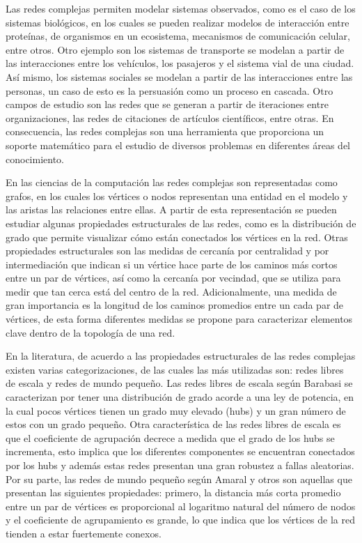 Las redes complejas permiten modelar sistemas observados, como es el caso de los sistemas biológicos\cite{Costa2008}, en los cuales se pueden realizar modelos de interacción entre proteínas, de organismos en un ecosistema, mecanismos de comunicación celular, entre otros. Otro ejemplo son los sistemas de transporte se modelan a partir de las interacciones entre los vehículos, los pasajeros y el sistema vial de una ciudad\cite{Wu2018}. Así mismo, los sistemas sociales se modelan a partir de las interacciones entre las personas, un caso de esto es la persuasión como un proceso en cascada\cite{Huang2016}. Otro campos de estudio son las redes que se generan a partir de iteraciones entre organizaciones\cite{6676578}, las redes de citaciones de artículos científicos\cite{Zhang2013}, entre otras. En consecuencia, las redes complejas son una herramienta que proporciona un soporte matemático para el estudio de diversos problemas en diferentes áreas del conocimiento.

En las ciencias de la computación las redes complejas\cite{BarabasiNetwork} son representadas como grafos, en los cuales los vértices o nodos representan una entidad en el modelo y las aristas las relaciones entre ellas. A partir de esta representación se pueden estudiar algunas propiedades estructurales de las redes, como es la distribución de grado que permite visualizar cómo están conectados los vértices en la red. Otras propiedades estructurales son las medidas de cercanía por centralidad y por intermediación que indican si un vértice hace parte de los caminos más cortos entre un par de vértices, así como la cercanía por vecindad, que se utiliza para medir que tan cerca está del centro de la red. Adicionalmente, una medida de gran importancia es la longitud de los caminos promedios entre un cada par de vértices, de esta forma diferentes medidas se propone para caracterizar elementos clave dentro de la topología de una red.

En la literatura, de acuerdo a las propiedades estructurales de las redes complejas existen varias categorizaciones, de las cuales las más utilizadas son: redes libres de escala y redes de mundo pequeño. Las redes libres de escala según Barabasi\cite{Albert2002} se caracterizan por tener una distribución de grado acorde a una ley de potencia, en la cual pocos vértices tienen un grado muy elevado (hubs) y un gran número de estos con un grado pequeño. Otra característica de las redes libres de escala es que el coeficiente de agrupación decrece a medida que el grado de los hubs se incrementa, esto implica que los diferentes componentes se encuentran conectados por los hubs y además estas redes presentan una gran robustez a fallas aleatorias. Por su parte, las redes de mundo pequeño según Amaral y otros\cite{Amaral2000} son aquellas que presentan las siguientes propiedades: primero, la distancia más corta promedio entre un par de vértices es proporcional al logaritmo natural del número de nodos y el coeficiente de agrupamiento es grande, lo que indica que los vértices de la red tienden a estar fuertemente conexos.

